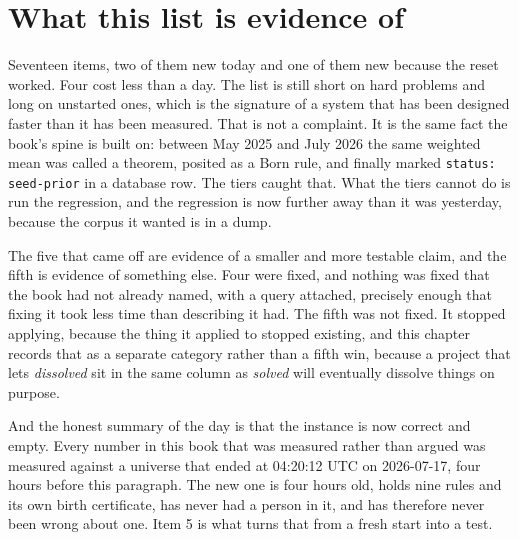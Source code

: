 \section{What this list is evidence of}

Seventeen items, two of them new today and one of them new because the reset worked. Four cost less than a day. The list is still short on hard problems and long on unstarted ones, which is the signature of a system that has been designed faster than it has been measured. That is not a complaint. It is the same fact the book's spine is built on: between May 2025 and July 2026 the same weighted mean was called a theorem, posited as a Born rule, and finally marked \texttt{status: seed-prior} in a database row. The tiers caught that. What the tiers cannot do is run the regression, and the regression is now further away than it was yesterday, because the corpus it wanted is in a dump.

The five that came off are evidence of a smaller and more testable claim, and the fifth is evidence of something else. Four were fixed, and nothing was fixed that the book had not already named, with a query attached, precisely enough that fixing it took less time than describing it had. The fifth was not fixed. It stopped applying, because the thing it applied to stopped existing, and this chapter records that as a separate category rather than a fifth win, because a project that lets \textit{dissolved} sit in the same column as \textit{solved} will eventually dissolve things on purpose.

And the honest summary of the day is that the instance is now correct and empty. Every number in this book that was measured rather than argued was measured against a universe that ended at 04:20:12 UTC on 2026-07-17, four hours before this paragraph. The new one is four hours old, holds nine rules and its own birth certificate, has never had a person in it, and has therefore never been wrong about one. Item 5 is what turns that from a fresh start into a test.
